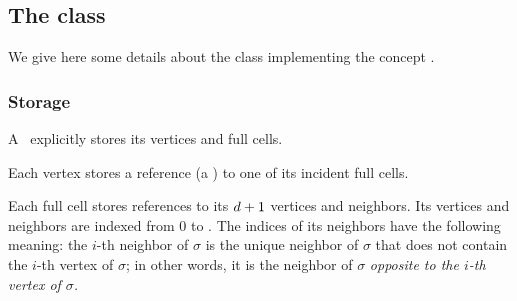 
\subsection{The class \label{triangulation:tds:impl}}

We give here some details about the class
implementing the concept .


\subsubsection{Storage}

A \tds\ explicitly stores its vertices and full cells.

Each vertex stores a reference (a ) to one of its incident
full cells.


Each full cell stores references to its $d+1$ vertices and
neighbors. Its vertices and neighbors are indexed from $0$ to \cd. The indices
of its neighbors have the following meaning: the $i$-th neighbor of $\sigma$
is the unique neighbor of $\sigma$ that does not contain the $i$-th vertex of
$\sigma$; in other words, it is the neighbor of $\sigma$ \em{opposite} to
the $i$-th vertex of $\sigma$.

